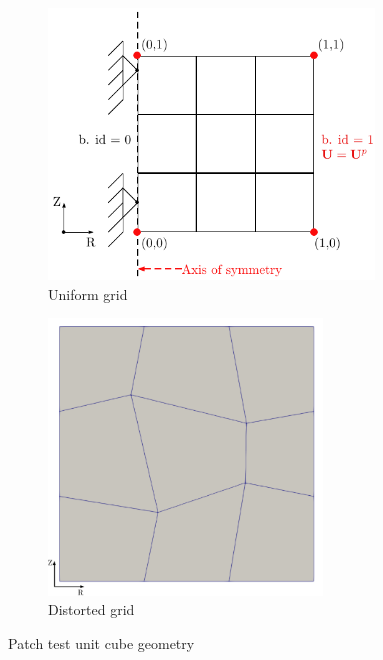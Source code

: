 \documentclass[11pt,a4paper,final]{article}
\begin{document}
\begin{figure}[h]
\centering
\begin{subfigure}{0.4\textwidth}
\centering
\includegraphics[width=0.95\textwidth]{patch_test_grid.pdf}
\caption{Uniform grid}
\label{fig:1.1.1}
\end{subfigure}
\begin{subfigure}{0.4\textwidth}
\centering
\includegraphics[width=0.8\textwidth]{patch_distort_grid.pdf}
\caption{Distorted grid}
\label{fig:1.1.2}
\end{subfigure}
\caption{Patch test unit cube geometry}
\label{fig:1.1}
\end{figure}
\end{document}
